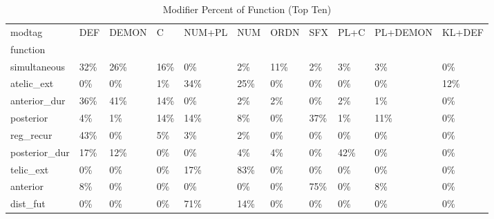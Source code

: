 \begin{table}[htbp!]
\centering
\caption{Modifier Percent of Function (Top Ten)}
\label{table:afmod_pc}
\begin{adjustbox}{width=1\textwidth}
\begin{tabular}{lllllllllll}
\toprule
modtag &  DEF & DEMON &    C & NUM+PL &  NUM & ORDN &  SFX & PL+C & PL+DEMON & KL+DEF \\
function      &      &       &      &        &      &      &      &      &          &        \\
\midrule
simultaneous  &  32\% &   26\% &  16\% &     0\% &   2\% &  11\% &   2\% &   3\% &       3\% &     0\% \\
atelic\_ext    &   0\% &    0\% &   1\% &    34\% &  25\% &   0\% &   0\% &   0\% &       0\% &    12\% \\
anterior\_dur  &  36\% &   41\% &  14\% &     0\% &   2\% &   2\% &   0\% &   2\% &       1\% &     0\% \\
posterior     &   4\% &    1\% &  14\% &    14\% &   8\% &   0\% &  37\% &   1\% &      11\% &     0\% \\
reg\_recur     &  43\% &    0\% &   5\% &     3\% &   2\% &   0\% &   0\% &   0\% &       0\% &     0\% \\
posterior\_dur &  17\% &   12\% &   0\% &     0\% &   4\% &   4\% &   0\% &  42\% &       0\% &     0\% \\
telic\_ext     &   0\% &    0\% &   0\% &    17\% &  83\% &   0\% &   0\% &   0\% &       0\% &     0\% \\
anterior      &   8\% &    0\% &   0\% &     0\% &   0\% &   0\% &  75\% &   0\% &       8\% &     0\% \\
dist\_fut      &   0\% &    0\% &   0\% &    71\% &  14\% &   0\% &   0\% &   0\% &       0\% &     0\% \\
\bottomrule
\end{tabular}
\end{adjustbox}
\end{table}
